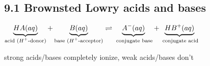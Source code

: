 \subsection*{9.1 Brownsted Lowry acids and bases}
    \begin{center}$
        \underbrace{HA (aq)}_\text{acid ($H^+$-donor)} + \underbrace{B (aq)}_\text{base ($H^+$-acceptor)} \rightleftharpoons \underbrace{A^- (aq)}_\text{\vphantom{$H^+$} conjugate base} + \underbrace{HB^+ (aq)}_\text{\vphantom{$H^+$} conjugate acid}
    $\end{center}
    strong acids/bases completely ionize, weak acids/bases don't
    \vspace*{0.0em}